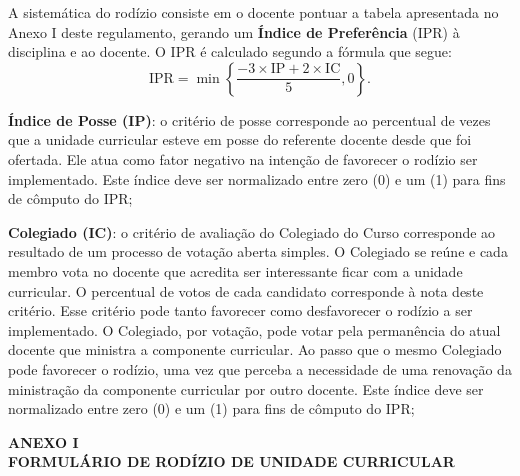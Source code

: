 \documentclass[
	12pt,				%
	openright,			%
	twoside,			%
	a4paper,			%
	chapter=TITLE,		%
	english,			%
	french,				%
	spanish,			%
	brazil,				%
	]{abntex2}
\begin{document}
\begin{anexos}
\begin{center}
\end{center}

A sistemática do rodízio consiste em o docente pontuar a tabela apresentada no Anexo I deste regulamento, gerando um \textbf{Índice de Preferência} (IPR) à disciplina e ao docente. O IPR é calculado segundo a fórmula que segue:
\begin{equation}
    \mathrm{IPR} = \min\left\{\frac{ -3 \times \mathrm{IP}  + 2\times \mathrm{IC}}{5}, 0 \right\}.
\end{equation}

\begin{alineas}
    \item \textbf{Índice de Posse (IP)}: o critério de posse corresponde ao percentual  de vezes que a unidade curricular esteve em posse do referente docente desde que foi ofertada. Ele atua como fator negativo na intenção de favorecer o rodízio ser implementado. Este índice deve ser normalizado  entre zero (0) e um (1) para fins de cômputo do IPR; 
        
    \item \textbf{Colegiado (IC)}: o critério de avaliação do Colegiado do Curso corresponde ao resultado de  um processo de votação aberta simples. O Colegiado se reúne e cada membro vota no docente que acredita ser interessante ficar com a unidade curricular.
    O percentual de votos de cada candidato corresponde à nota deste critério. Esse critério pode tanto favorecer como desfavorecer o rodízio a ser implementado. O Colegiado, por votação, pode votar pela permanência do atual docente que ministra a componente curricular. Ao passo que o mesmo Colegiado pode favorecer o rodízio, uma vez que perceba a necessidade de uma renovação da ministração da componente curricular por outro docente.  Este índice deve ser normalizado  entre zero (0) e um (1) para fins de cômputo do IPR; 
    
\end{alineas}

\begin{center}\bfseries
	ANEXO I
	\\
	FORMULÁRIO DE RODÍZIO DE UNIDADE CURRICULAR
	
\end{center}

% 
% 
% 




\end{anexos}
\end{document}
